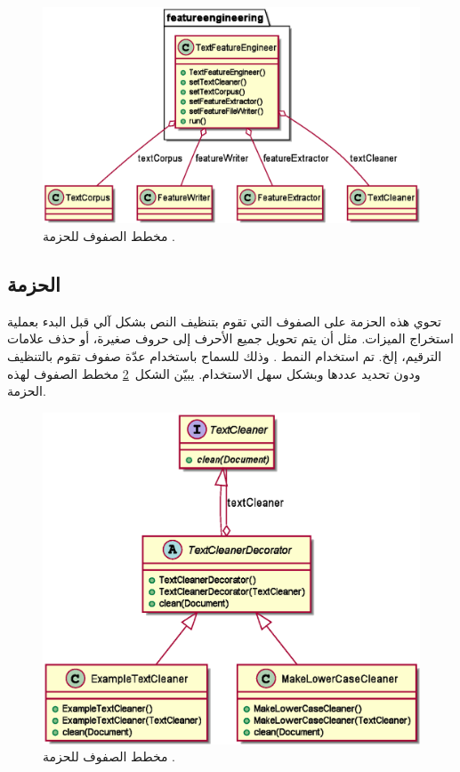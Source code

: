 \begin{figure}[htb]
	\centering
	\includegraphics[width=0.8\linewidth]{images/cd-featureengineering.eps}
	\caption{%
		مخطط الصفوف للحزمة .
	}
	\label{fig:cd:featureengineering}
\end{figure}




\subsection{الحزمة }
تحوي هذه الحزمة على الصفوف التي تقوم بتنظيف النص بشكل آلي قبل البدء بعملية استخراج الميزات.
مثل أن يتم تحويل جميع الأحرف إلى حروف صغيرة، أو حذف علامات الترقيم، إلخ.
تم استخدام النمط .
وذلك للسماح باستخدام عدّة صفوف تقوم بالتنظيف ودون تحديد عددها وبشكل سهل الاستخدام.
يبيّن الشكل~\ref{fig:cd:cleaners} مخطط الصفوف لهذه الحزمة.

\begin{figure}[htb]
	\centering
	\includegraphics[width=0.75\linewidth]{images/cd-cleaners.eps}
	\caption{%
		مخطط الصفوف للحزمة .
	}
	\label{fig:cd:cleaners}
\end{figure}




